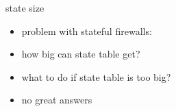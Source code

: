 \begin{frame}{state size}
    \begin{itemize}
    \item problem with stateful firewalls: 
    \item how big can state table get?
    \item what to do if state table is too big?
    \vspace{.5cm}
    \item no great answers
    \end{itemize}
\end{frame}

